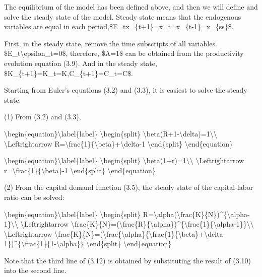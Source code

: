\documentclass[10pt,math=newtx,citestyle=gb7714-2015,bibstyle=gb7714-2015]{elegantbook}
\begin{document}
	
	The equilibrium of the model has been defined above, and then we will define and solve the steady state of the model. Steady state means that the endogenous variables are equal in each period,\$E\_tx\_\{t+1\}=x\_t=x\_\{t-1\}=x\_\{ss\}\$.
	
	First, in the steady state, remove the time subscripts of all variables. \$E\_t\textbackslash{}epsilon\_t=0\$, therefore, \$A=1\$ can be obtained from the productivity evolution equation (3.9). And in the steady state, \$K\_\{t+1\}=K\_t=K,C\_\{t+1\}=C\_t=C\$.
	
	Starting from Euler's equations (3.2) and (3.3), it is easiest to solve the steady state. 
	
	(1) From (3.2) and (3.3),
	
	\textbackslash{}begin\{equation\}\textbackslash{}label\{label\}
	\textbackslash{}begin\{split\}
	\textbackslash{}beta(R+1-\textbackslash{}delta)=1\textbackslash{}\textbackslash{}
	\textbackslash{}Leftrightarrow R=\textbackslash{}frac\{1\}\{\textbackslash{}beta\}+\textbackslash{}delta-1
	\textbackslash{}end\{split\}
	\textbackslash{}end\{equation\}
	
	\textbackslash{}begin\{equation\}\textbackslash{}label\{label\}
	\textbackslash{}begin\{split\}
	\textbackslash{}beta(1+r)=1\textbackslash{}\textbackslash{}
	\textbackslash{}Leftrightarrow r=\textbackslash{}frac\{1\}\{\textbackslash{}beta\}-1
	\textbackslash{}end\{split\}
	\textbackslash{}end\{equation\}
	
	(2) From the capital demand function (3.5), the steady state of the capital-labor ratio can be solved:
	
	\textbackslash{}begin\{equation\}\textbackslash{}label\{label\}
	\textbackslash{}begin\{split\}
	R=\textbackslash{}alpha(\textbackslash{}frac\{K\}\{N\})\^{}\{\textbackslash{}alpha-1\}\textbackslash{}\textbackslash{}
	\textbackslash{}Leftrightarrow \textbackslash{}frac\{K\}\{N\}=(\textbackslash{}frac\{R\}\{\textbackslash{}alpha\})\^{}\{\textbackslash{}frac\{1\}\{\textbackslash{}alpha-1\}\}\textbackslash{}\textbackslash{}
	\textbackslash{}Leftrightarrow \textbackslash{}frac\{K\}\{N\}=(\textbackslash{}frac\{\textbackslash{}alpha\}\{\textbackslash{}frac\{1\}\{\textbackslash{}beta\}+\textbackslash{}delta-1\})\^{}\{\textbackslash{}frac\{1\}\{1-\textbackslash{}alpha\}\}
	\textbackslash{}end\{split\}
	\textbackslash{}end\{equation\}
	
	Note that the third line of (3.12) is obtained by substituting the result of (3.10) into the second line.
	
\end{document}
